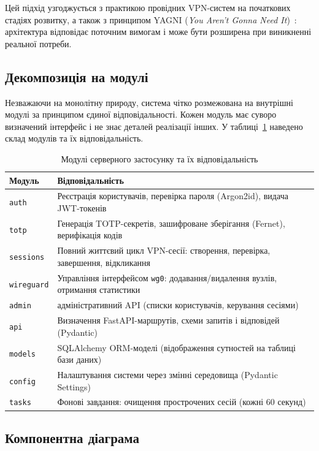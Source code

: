 Цей підхід узгоджується з практикою провідних VPN-систем на початкових
стадіях розвитку, а також з принципом YAGNI (\textit{You Aren't Gonna
Need It})~\cite{beck1999extreme}: архітектура відповідає поточним вимогам і
може бути розширена при виникненні реальної потреби.

\subsection{Декомпозиція на модулі}

Незважаючи на монолітну природу, система чітко розмежована на внутрішні
модулі за принципом єдиної відповідальності. Кожен модуль має суворо визначений
інтерфейс і не знає деталей реалізації інших. У таблиці~\ref{tab:modules}
наведено склад модулів та їх відповідальність.

\begin{table}[htbp]
\caption{Модулі серверного застосунку та їх відповідальність}
\label{tab:modules}
\begin{tabularx}{\textwidth}{|l|X|}
\hline
\textbf{Модуль} & \textbf{Відповідальність} \\
\hline
\texttt{auth} & Реєстрація користувачів, перевірка пароля (Argon2id), видача JWT-токенів \\
\hline
\texttt{totp} & Генерація TOTP-секретів, зашифроване зберігання (Fernet), верифікація кодів \\
\hline
\texttt{sessions} & Повний життєвий цикл VPN-сесії: створення, перевірка, завершення, відкликання \\
\hline
\texttt{wireguard} & Управління інтерфейсом \texttt{wg0}: додавання/видалення вузлів, отримання статистики \\
\hline
\texttt{admin} & адміністративний API (списки користувачів, керування сесіями) \\
\hline
\texttt{api} & Визначення FastAPI-маршрутів, схеми запитів і відповідей (Pydantic) \\
\hline
\texttt{models} & SQLAlchemy ORM-моделі (відображення сутностей на таблиці бази даних) \\
\hline
\texttt{config} & Налаштування системи через змінні середовища (Pydantic Settings) \\
\hline
\texttt{tasks} & Фонові завдання: очищення прострочених сесій (кожні 60 секунд) \\
\hline
\end{tabularx}
\end{table}

\subsection{Компонентна діаграма}

